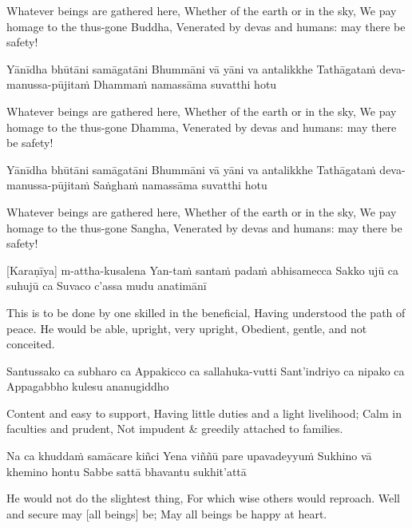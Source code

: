 \begin{english}
  Whatever beings are gathered here,
  Whether of the earth or in the sky,
  We pay homage to the thus-gone Buddha,
  Venerated by devas and humans: may there be safety!
\end{english}

Yānīdha bhūtāni samāgatāni
Bhummāni vā yāni va antalikkhe
Tathāgataṁ deva-manussa-pūjitaṁ
Dhammaṁ namassāma suvatthi hotu

\begin{english}
  Whatever beings are gathered here,
  Whether of the earth or in the sky,
  We pay homage to the thus-gone Dhamma,
  Venerated by devas and humans: may there be safety!
\end{english}

Yānīdha bhūtāni samāgatāni
Bhummāni vā yāni va antalikkhe
Tathāgataṁ deva-manussa-pūjitaṁ
Saṅghaṁ namassāma suvatthi hotu

\begin{english}
  Whatever beings are gathered here,
  Whether of the earth or in the sky,
  We pay homage to the thus-gone Sangha,
  Venerated by devas and humans: may there be safety!
\end{english}

\suttaRef{[Snp 2.1]}

[Karaṇīya] m-attha-kusalena
Yan-taṁ santaṁ padaṁ abhisamecca
Sakko ujū ca suhujū ca
Suvaco c’assa mudu anatimānī

\begin{english}
  This is to be done by one skilled in the beneficial,
  Having understood the path of peace.
  He would be able, upright, very upright,
  Obedient, gentle, and not conceited.
\end{english}

Santussako ca subharo ca
Appakicco ca sallahuka-vutti
Sant’indriyo ca nipako ca
Appagabbho kulesu ananugiddho

\begin{english}
  Content and easy to support,
  Having little duties and a light livelihood;
  Calm in faculties and prudent,
  Not impudent \& greedily attached to families.
\end{english}

Na ca khuddaṁ samācare kiñci
Yena viññū pare upavadeyyuṁ
Sukhino vā khemino hontu
Sabbe sattā bhavantu sukhit’attā

\begin{english}
  He would not do the slightest thing,
  For which wise others would reproach.
  Well and secure may [all beings] be;
  May all beings be happy at heart.
\end{english}

